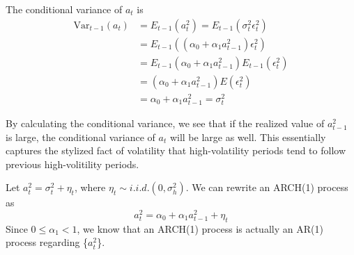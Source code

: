 \documentclass[a4paper,11pt]{article}
\newcommand{\var}{\mathrm{Var}}
\begin{document}
The conditional variance of \(a_t\) is 
\begin{equation*}
\begin{split}
\var_{t-1}(a_t) &= E_{t-1}(a^2_t) = E_{t-1} \left( \sigma^2_t \epsilon_t^2 \right) \\
&= E_{t-1}\left((\alpha_0 + \alpha_1 a^2_{t-1}) \epsilon^2_t \right) \\
&= E_{t-1}(\alpha_0 + \alpha_1 a^2_{t-1}) E_{t-1}(\epsilon^2_t) \\
&= (\alpha_0 + \alpha_1 a^2_{t-1}) E(\epsilon^2_t) \\
&= \alpha_0 + \alpha_1 a^2_{t-1} = \sigma^2_t
\end{split}
\end{equation*}

By calculating the conditional variance, we see that if the realized
value of \(a^2_{t-1}\) is large, the conditional variance of \(a_t\) will
be large as well. This essentially captures the stylized fact of
volatility that high-volatility periods tend to follow previous
high-volitility periods. 

Let \(a^2_t = \sigma^2_t + \eta_t\), where \(\eta_t \sim i.i.d.(0,
\sigma^2_h)\). We can rewrite an ARCH(1) process as
\[ a^2_t = \alpha_0 + \alpha_1 a^2_{t-1} + \eta_t \]
Since \(0 \leq \alpha_1 < 1\), we know that an ARCH(1) process is
actually an AR(1) process regarding \{\(a^2_t\)\}. 
\end{document}
